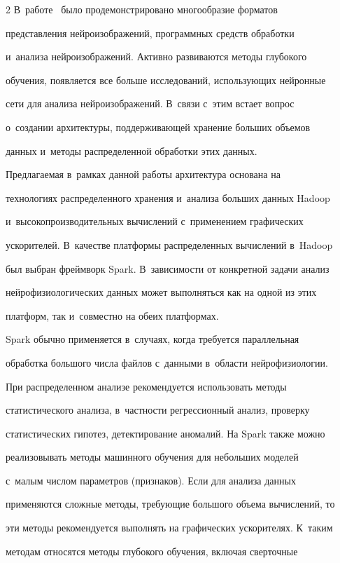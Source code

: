 \begin{multicols}{2}
В~работе~\cite{6-st} было продемонстрировано многообразие форматов 

представления ней\-ро\-изоб\-ра\-же\-ний, программных средств обработки 

и~анализа ней\-ро\-изоб\-ра\-же\-ний. Активно развиваются методы глубокого 

обучения, появляется все больше исследований, использующих нейронные 

сети для анализа ней\-ро\-изоб\-ра\-же\-ний. В~связи с~этим встает вопрос 

о~создании архитектуры, поддерживающей хранение больших объемов 

данных и~методы распределенной обработки этих данных. 

    

    Предлагаемая в~рамках данной работы архитектура основана на 

технологиях распределенного хранения и~анализа больших данных Hadoop 

и~высокопроизводительных вычислений с~применением графических 

ускорителей. В~качестве платформы распределенных вычислений в~Hadoop 

был выбран фреймворк Spark. В~зависимости от конкретной задачи анализ 

нейрофизиологических данных может выполняться как на одной из этих 

платформ, так и~совместно на обеих платформах. 

    

    Spark обычно применяется в~случаях, когда требуется параллельная 

обработка большого чис\-ла файлов с~данными в~об\-ласти нейрофизиологии. 

При распределенном анализе рекомендуется использовать методы 

статистического анализа, в~част\-ности регрессионный анализ, проверку 

статистических гипотез, детектирование аномалий. На Spark также можно 

реализовывать методы машинного обучения для небольших моделей 

с~малым числом параметров (признаков). Если для анализа данных 

применяются сложные методы, тре\-бу\-ющие большого объема вы\-чис\-ле\-ний, то 

эти методы рекомендуется выполнять на графических ускорителях. К~таким 

методам относятся методы глубокого обуче\-ния, включая сверточные 


\end{multicols}
